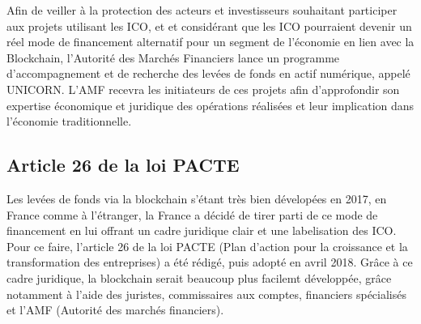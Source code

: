 \documentclass[12pt, a4paper, oneside]{book}
\begin{document}
    Afin de veiller à la protection des acteurs et investisseurs souhaitant participer
    aux projets utilisant les ICO, et et considérant que les ICO pourraient devenir un réel mode de financement alternatif
    pour un segment de l'économie en lien avec la Blockchain, l'Autorité des Marchés Financiers
    lance un programme d'accompagnement et de recherche des levées de fonds en actif numérique, appelé UNICORN.
    L'AMF recevra les initiateurs de ces projets afin d'approfondir son expertise économique et juridique
    des opérations réalisées et leur implication dans l'économie traditionnelle.
    \cite{unicorn}
    
    \subsection{Article 26 de la loi PACTE}

    Les levées de fonds via la blockchain s'étant très bien dévelopées en 2017, en France comme à l'étranger, 
    la France a décidé de tirer parti de ce mode de financement en lui offrant un cadre juridique clair et une labelisation des ICO.
    Pour ce faire, l'article 26 de la loi PACTE (Plan d'action pour la croissance et la transformation des entreprises) a été rédigé, puis adopté en avril 2018. 
    Grâce à ce cadre juridique, la blockchain serait beaucoup plus facilemt développée, grâce notamment à l'aide des juristes, commissaires aux comptes, 
    financiers spécialisés et l'AMF (Autorité des marchés financiers).
    \cite{art26ico}

 
 
 
    
    \backmatter
 

    
    
 
\end{document}
